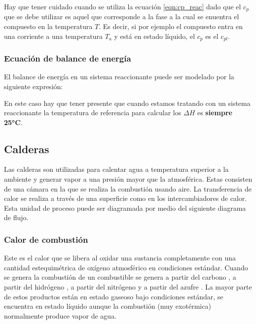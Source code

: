 Hay que tener cuidado cuando se utiliza la ecuación \ref{eqn:cp_reac} dado que el $c_p$ que se debe utilizar es aquel que corresponde a la fase a la cual se enuentra el compuesto en la temperatura $T$. Es decir, si por ejemplo el compuesto entra en una corriente a una temperatura $T_a$ y está en estado líquido, el $c_p$ es el $c_{pl}$.

\subsubsection{Ecuación de balance de energía}

El balance de energía en un sistema reaccionante puede ser modelado por la siguiente expresión:


En este caso hay que tener presente que cuando estamos tratando con un sistema reaccionante la temperatura de referencia para calcular los $\Delta H$ es \textbf{siempre 25°C}.

\subsection{Calderas}


Las calderas son utilizadas para calentar agua a temperatura superior a la ambiente y generar vapor a una presión mayor que la atmosférica.
Estas consisten de una cámara en la que se realiza la combustión usando aire. La transferencia de calor se realiza a través de una superficie como en los intercambiadores de calor.
Esta unidad de proceso puede ser diagramada por medio del siguiente diagrama de flujo.


\subsubsection{Calor de combustión}

Este es el calor que se libera al oxidar una sustancia completamente con una cantidad estequimétrica de oxígeno atmosférico en condiciones estándar.
Cuando se genera la combustión de un combustible se genera a partir del carbono , a partir del hidrógeno , a partir del nitrógeno  y a partir del azufre . 
La mayor parte de estos productos están en estado gaseoso bajo condiciones estándar,  se encuentra en estado líquido aunque la combustión (muy exotérmica) normalmente produce vapor de agua.

